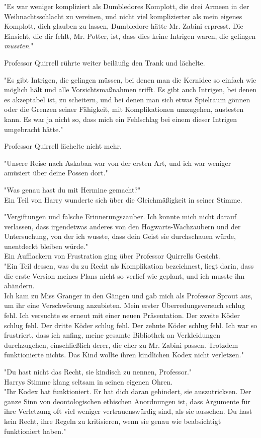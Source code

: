 {"Es war weniger kompliziert als Dumbledores Komplott, die drei Armeen in der Weihnachtsschlacht zu vereinen, und nicht viel komplizierter als mein eigenes Komplott, dich glauben zu lassen, Dumbledore hätte Mr. Zabini erpresst. Die Einsicht, die dir fehlt, Mr. Potter, ist, dass dies keine Intrigen waren, die gelingen \emph{mussten}."

Professor Quirrell rührte weiter beiläufig den Trank und lächelte.

"Es gibt Intrigen, die gelingen müssen, bei denen man die Kernidee so einfach wie möglich hält und alle Vorsichtsmaßnahmen trifft. Es gibt auch Intrigen, bei denen es akzeptabel ist, zu scheitern, und bei denen man sich etwas Spielraum gönnen oder die Grenzen seiner Fähigkeit, mit Komplikationen umzugehen, austesten kann. Es war ja nicht so, dass mich ein Fehlschlag bei einem dieser Intrigen umgebracht hätte."

Professor Quirrell lächelte nicht mehr.

"Unsere Reise nach Askaban war von der ersten Art, und ich war weniger amüsiert über deine Possen dort."

"Was genau hast du mit Hermine gemacht?"\\ Ein Teil von Harry wunderte sich über die Gleichmäßigkeit in seiner Stimme.

"Vergiftungen und falsche Erinnerungszauber. Ich konnte mich nicht darauf verlassen, dass irgendetwas anderes von den Hogwarts-Wachzaubern und der Untersuchung, von der ich wusste, dass dein Geist sie durchschauen würde, unentdeckt bleiben würde."\\ Ein Aufflackern von Frustration ging über Professor Quirrells Gesicht.\\ "Ein Teil dessen, was du zu Recht als Komplikation bezeichnest, liegt darin, dass die erste Version meines Plans nicht so verlief wie geplant, und ich musste ihn abändern.\\ Ich kam zu Miss Granger in den Gängen und gab mich als Professor Sprout aus, um ihr eine Verschwörung anzubieten. Mein erster Überredungsversuch schlug fehl. Ich versuchte es erneut mit einer neuen Präsentation. Der zweite Köder schlug fehl. Der dritte Köder schlug fehl. Der zehnte Köder schlug fehl. Ich war so frustriert, dass ich anfing, meine gesamte Bibliothek an Verkleidungen durchzugehen, einschließlich derer, die eher zu Mr. Zabini passen. Trotzdem funktionierte nichts. Das Kind wollte ihren kindlichen Kodex nicht verletzen."

"Du hast nicht das Recht, sie kindisch zu nennen, Professor."\\ Harrys Stimme klang seltsam in seinen eigenen Ohren.\\ "Ihr Kodex hat funktioniert. Er hat dich daran gehindert, sie auszutricksen. Der ganze Sinn von deontologischen ethischen Anordnungen ist, dass Argumente für ihre Verletzung oft viel weniger vertrauenswürdig sind, als sie aussehen. Du hast kein Recht, ihre Regeln zu kritisieren, wenn sie genau wie beabsichtigt funktioniert haben."

}
